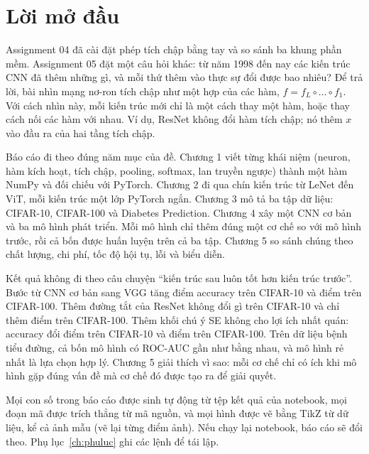 \chapter*{Lời mở đầu}

Assignment 04 đã cài đặt phép tích chập bằng tay và so sánh ba khung phần mềm. Assignment 05 đặt một câu hỏi khác:
từ năm 1998 đến nay các kiến trúc CNN đã thêm những gì, và mỗi thứ thêm vào thực sự đổi được bao nhiêu? Để trả lời,
bài nhìn mạng nơ-ron tích chập như một hợp của các hàm, $f = f_L\circ\dots\circ f_1$. Với cách nhìn này, mỗi kiến
trúc mới chỉ là một cách thay một hàm, hoặc thay cách nối các hàm với nhau. Ví dụ, ResNet không đổi hàm tích chập;
nó thêm $x$ vào đầu ra của hai tầng tích chập.

Báo cáo đi theo đúng năm mục của đề. Chương 1 viết từng khái niệm (neuron, hàm kích hoạt, tích chập, pooling,
softmax, lan truyền ngược) thành một hàm NumPy và đối chiếu với PyTorch. Chương 2 đi qua chín kiến trúc từ LeNet đến ViT,
mỗi kiến trúc một lớp PyTorch ngắn. Chương 3 mô tả ba tập dữ liệu: CIFAR-10, CIFAR-100 và Diabetes Prediction. Chương 4
xây một CNN cơ bản và ba mô hình phát triển. Mỗi mô hình chỉ thêm đúng một cơ chế so với mô hình trước, rồi cả bốn được
huấn luyện trên cả ba tập. Chương 5 so sánh chúng theo chất lượng, chi phí, tốc độ hội tụ, lỗi và biểu diễn.

Kết quả không đi theo câu chuyện ``kiến trúc sau luôn tốt hơn kiến trúc trước''. Bước từ CNN cơ bản sang VGG tăng
 điểm accuracy trên CIFAR-10 và  điểm trên CIFAR-100.
Thêm đường tắt của ResNet không đổi gì trên CIFAR-10 và chỉ thêm  điểm trên CIFAR-100.
Thêm khối chú ý SE không cho lợi ích nhất quán: accuracy đổi  điểm trên CIFAR-10
và  điểm trên CIFAR-100. Trên dữ liệu bệnh tiểu đường, cả bốn mô hình có
ROC-AUC gần như bằng nhau, và mô hình rẻ nhất là lựa chọn hợp lý. Chương 5 giải thích vì sao: mỗi cơ chế chỉ có ích khi mô hình
gặp đúng vấn đề mà cơ chế đó được tạo ra để giải quyết.

Mọi con số trong báo cáo được sinh tự động từ tệp kết quả của notebook, mọi đoạn mã được trích thẳng từ mã nguồn, và
mọi hình được vẽ bằng TikZ từ dữ liệu, kể cả ảnh mẫu (vẽ lại từng điểm ảnh). Nếu chạy lại notebook, báo cáo sẽ đổi theo.
Phụ lục~\ref{ch:phuluc} ghi các lệnh để tái lập.

